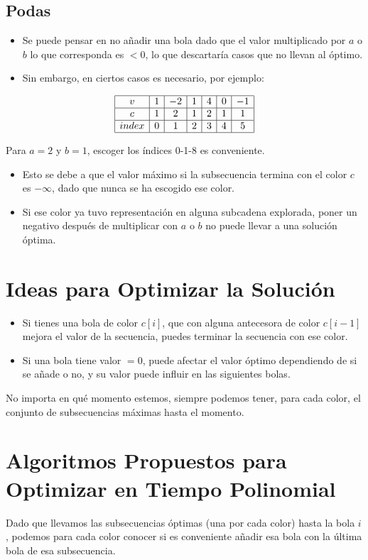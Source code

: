 \documentclass{article}
\begin{document}
\subsection*{Podas}
\begin{itemize}
    \item Se puede pensar en no añadir una bola dado que el valor multiplicado por $a$ o $b$ lo que corresponda es $< 0$, lo que descartaría casos que no llevan al óptimo.
    \item Sin embargo, en ciertos casos es necesario, por ejemplo:
\end{itemize}

\[
\begin{array}{|c|c|c|c|c|c|c|}
\hline
v & 1 & -2 & 1 & 4 & 0 & -1 \\
\hline
c & 1 & 2 & 1 & 2 & 1 & 1 \\
\hline
index & 0 & 1 & 2 & 3 & 4 & 5 \\
\hline
\end{array}
\]

Para $a=2$ y $b=1$, escoger los índices 0-1-8 es conveniente.
\begin{itemize}
    \item Esto se debe a que el valor máximo si la subsecuencia termina con el color $c$ es $-\infty$, dado que nunca se ha escogido ese color.
    \item Si ese color ya tuvo representación en alguna subcadena explorada, poner un negativo después de multiplicar con $a$ o $b$ no puede llevar a una solución óptima.
\end{itemize}

\section*{Ideas para Optimizar la Solución}
\begin{itemize}
    \item Si tienes una bola de color $c[i]$, que con alguna antecesora de color $c[i-1]$ mejora el valor de la secuencia, puedes terminar la secuencia con ese color.
    \item Si una bola tiene valor $=0$, puede afectar el valor óptimo dependiendo de si se añade o no, y su valor puede influir en las siguientes bolas.
\end{itemize}

No importa en qué momento estemos, siempre podemos tener, para cada color, el conjunto de subsecuencias máximas hasta el momento. 

\section*{Algoritmos Propuestos para Optimizar en Tiempo Polinomial}
Dado que llevamos las subsecuencias óptimas (una por cada color) hasta la bola $i$, podemos para cada color conocer si es conveniente añadir esa bola con la última bola de esa subsecuencia.
\end{document}
